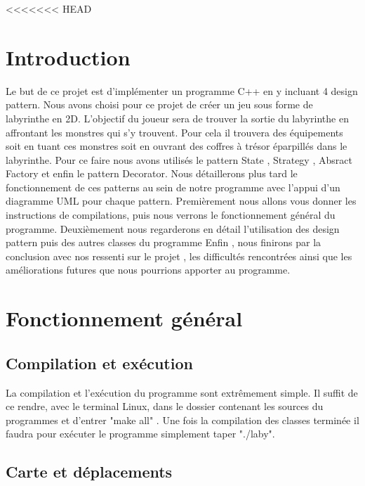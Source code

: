 \documentclass[a4paper]{article}
\author{\docsauthor}
\title{\docstitle}
\date{\today}
\begin{document}
<<<<<<< HEAD
	\maketitle{}
	\thispagestyle{empty}
	\newpage
	\tableofcontents{}
	\newpage
	\section{Introduction}

Le but de ce projet est d’implémenter un programme C++ en y incluant 4 design pattern.
Nous avons choisi pour ce projet de créer un jeu sous forme de labyrinthe en 2D. L'objectif du joueur sera
de trouver la sortie du labyrinthe en affrontant les monstres qui s'y trouvent. Pour cela il trouvera des équipements soit
en tuant ces monstres soit en ouvrant des coffres à trésor éparpillés dans le labyrinthe.
Pour ce faire nous avons utilisés le pattern State , Strategy , Absract Factory et enfin le pattern Decorator. Nous détaillerons plus tard
le fonctionnement de ces patterns au sein de notre programme avec l'appui d'un diagramme UML pour chaque pattern.
Premièrement nous allons vous donner les instructions de compilations, puis nous verrons le fonctionnement général du programme.
Deuxièmement nous regarderons en détail l'utilisation des design pattern puis des autres classes du programme
Enfin , nous finirons par la conclusion avec nos ressenti sur le projet , les difficultés rencontrées ainsi que les améliorations futures
que nous pourrions apporter au programme.


	\section{Fonctionnement général}

    \subsection{Compilation et exécution}
        
 La compilation et l’exécution du programme sont extrêmement simple. Il suffit de ce rendre, avec le terminal Linux, dans le dossier contenant
 les sources du programmes et d'entrer "make all" .
 Une fois la compilation des classes terminée il faudra pour exécuter le programme simplement taper "./laby".
 
    \subsection{Carte et déplacements}
    
\end{document}
